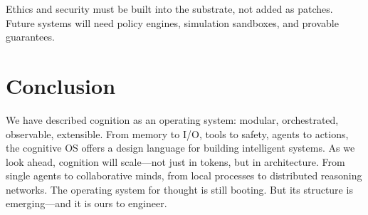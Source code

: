 \documentclass{book}
\begin{document}
Ethics and security must be built into the substrate, not added as patches. Future systems will need policy engines, simulation sandboxes, and provable guarantees.

\section*{Conclusion}

We have described cognition as an operating system: modular, orchestrated, observable, extensible. From memory to I/O, tools to safety, agents to actions, the cognitive OS offers a design language for building intelligent systems. As we look ahead, cognition will scale—not just in tokens, but in architecture. From single agents to collaborative minds, from local processes to distributed reasoning networks. The operating system for thought is still booting. But its structure is emerging—and it is ours to engineer.
\end{document}
